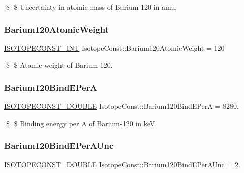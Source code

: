 \$ \$ Uncertainty in atomic mass of Barium-\/120 in amu. \mbox{\label{group___isotope_const-_barium-_ba120_gae2719a38b46782b19b6365db7c4ea355}} 
\subsubsection{\texorpdfstring{Barium120\+Atomic\+Weight}{Barium120AtomicWeight}}
{\footnotesize\ttfamily \mbox{\hyperlink{group___isotope_const-_macros_ga5f18360b3e99483a35c32d789e62621c}{I\+S\+O\+T\+O\+P\+E\+C\+O\+N\+S\+T\+\_\+\+I\+NT}} Isotope\+Const\+::\+Barium120\+Atomic\+Weight = 120}

\$ \$ Atomic weight of Barium-\/120. \mbox{\label{group___isotope_const-_barium-_ba120_ga3ce6570e237902be34566d838883d084}} 
\subsubsection{\texorpdfstring{Barium120\+Bind\+E\+PerA}{Barium120BindEPerA}}
{\footnotesize\ttfamily \mbox{\hyperlink{group___isotope_const-_macros_ga8f45a7272ce02c0b4c65c44636ed719a}{I\+S\+O\+T\+O\+P\+E\+C\+O\+N\+S\+T\+\_\+\+D\+O\+U\+B\+LE}} Isotope\+Const\+::\+Barium120\+Bind\+E\+PerA = 8280.}

\$ \$ Binding energy per A of Barium-\/120 in keV. \mbox{\label{group___isotope_const-_barium-_ba120_gaf910710fa2312272758efa817ee1826b}} 
\subsubsection{\texorpdfstring{Barium120\+Bind\+E\+Per\+A\+Unc}{Barium120BindEPerAUnc}}
{\footnotesize\ttfamily \mbox{\hyperlink{group___isotope_const-_macros_ga8f45a7272ce02c0b4c65c44636ed719a}{I\+S\+O\+T\+O\+P\+E\+C\+O\+N\+S\+T\+\_\+\+D\+O\+U\+B\+LE}} Isotope\+Const\+::\+Barium120\+Bind\+E\+Per\+A\+Unc = 2.}

